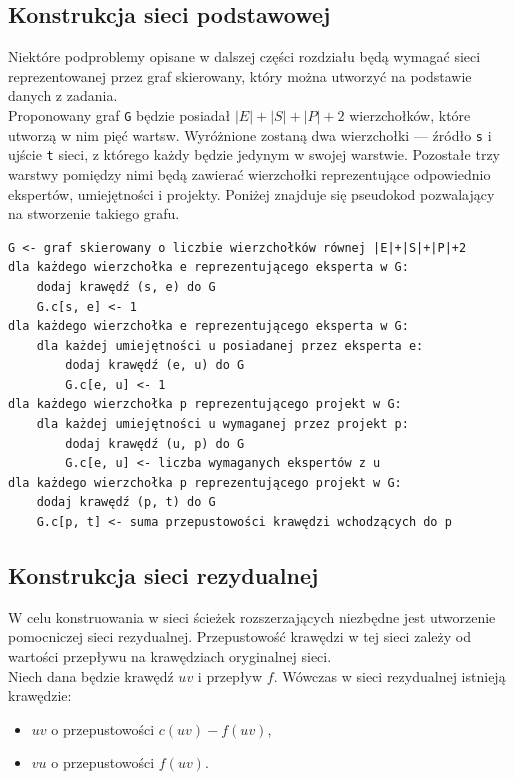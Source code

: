 \documentclass[12pt,a4paper]{article}
\theoremstyle{definition}
\begin{document}
\subsection{Konstrukcja sieci podstawowej}
Niektóre podproblemy opisane w dalszej części rozdziału będą wymagać sieci reprezentowanej przez graf skierowany, który można utworzyć na podstawie danych z zadania.\\

\noindent
Proponowany graf \texttt{G} będzie posiadał $|E|+|S|+|P|+2$ wierzchołków, które utworzą w nim pięć wartsw. Wyróżnione zostaną dwa wierzchołki --- źródło \texttt{s} i ujście \texttt{t} sieci, z którego każdy będzie jedynym w swojej warstwie. Pozostałe trzy warstwy pomiędzy nimi będą zawierać wierzchołki reprezentujące odpowiednio ekspertów, umiejętności i projekty. Poniżej znajduje się pseudokod pozwalający na stworzenie takiego grafu.\\

\begin{tcolorbox}[title=Konstrukcja sieci podstawowej]
\begin{verbatim}
G <- graf skierowany o liczbie wierzchołków równej |E|+|S|+|P|+2
dla każdego wierzchołka e reprezentującego eksperta w G:
    dodaj krawędź (s, e) do G
    G.c[s, e] <- 1
dla każdego wierzchołka e reprezentującego eksperta w G:
    dla każdej umiejętności u posiadanej przez eksperta e:
        dodaj krawędź (e, u) do G
        G.c[e, u] <- 1
dla każdego wierzchołka p reprezentującego projekt w G:
    dla każdej umiejętności u wymaganej przez projekt p:
        dodaj krawędź (u, p) do G
        G.c[e, u] <- liczba wymaganych ekspertów z u
dla każdego wierzchołka p reprezentującego projekt w G:
    dodaj krawędź (p, t) do G
    G.c[p, t] <- suma przepustowości krawędzi wchodzących do p
\end{verbatim}
\end{tcolorbox}

\subsection{Konstrukcja sieci rezydualnej}
W celu konstruowania w sieci ścieżek rozszerzających niezbędne jest utworzenie pomocniczej sieci rezydualnej. Przepustowość krawędzi w tej sieci zależy od wartości przepływu na krawędziach oryginalnej sieci.\\

\noindent
Niech dana będzie krawędź $uv$ i przepływ $f$. Wówczas w sieci rezydualnej istnieją krawędzie:
\begin{itemize}
	\item $uv$ o przepustowości $c(uv) - f(uv)$,
	\item $vu$ o przepustowości $f(uv)$.
\end{itemize}
\end{document}
